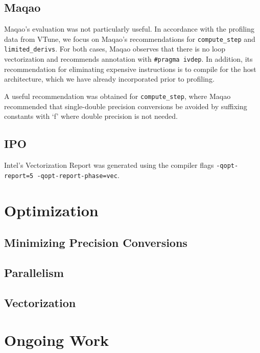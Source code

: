 \documentclass{scrartcl}
\begin{document}
    \subsection{Maqao}
    Maqao's evaluation was not particularly useful. In accordance with the profiling data from VTune, we focus on Maqao's recommendations for \verb|compute_step| and \verb|limited_derivs|. For both cases, Maqao observes that there is no loop vectorization and recommends annotation with \verb|#pragma ivdep|. In addition, its recommendation for eliminating expensive instructions is to compile for the host architecture, which we have already incorporated prior to profiling.

    A useful recommendation was obtained for \verb|compute_step|, where Maqao recommended that single-double precision conversions be avoided by suffixing constants with `f' where double precision is not needed.
    \subsection{IPO}
    Intel's Vectorization Report was generated using the compiler flags \verb|-qopt-report=5 -qopt-report-phase=vec|.
  \section{Optimization}
    \subsection{Minimizing Precision Conversions}
    \subsection{Parallelism}
    \subsection{Vectorization}
  \section{Ongoing Work}
\end{document}
